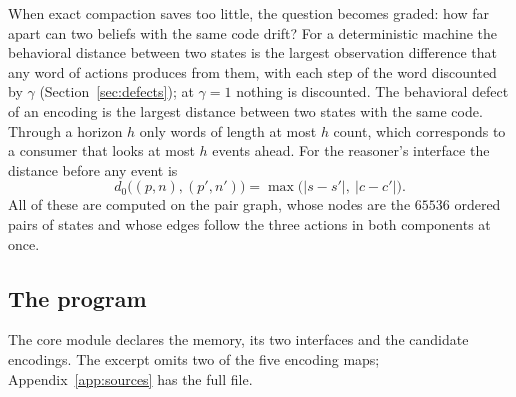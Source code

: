 \documentclass[11pt]{article}
\theoremstyle{definition}
\theoremstyle{plain}
\begin{document}
When exact compaction saves too little, the question becomes graded: how far apart can two
beliefs with the same code drift? For a deterministic machine the behavioral distance between two
states is the largest observation difference that any word of actions produces from them, with
each step of the word discounted by $\gamma$ (Section~\ref{sec:defects}); at $\gamma=1$ nothing is
discounted. The behavioral defect of an encoding is the largest distance between two states with
the same code. Through a horizon $h$ only words of length at most $h$ count, which corresponds to
a consumer that looks at most $h$ events ahead. For the reasoner's interface the distance before
any event is
\[
d_0\bigl((p,n),(p',n')\bigr)=\max\bigl(|s-s'|,\ |c-c'|\bigr).
\]
All of these are computed on the pair graph, whose nodes are the $65536$ ordered pairs of states and
whose edges follow the three actions in both components at once.

\subsection{The program}

The core module declares the memory, its two interfaces and the candidate encodings. The excerpt
omits two of the five encoding maps; Appendix~\ref{app:sources} has the full file.
\end{document}
